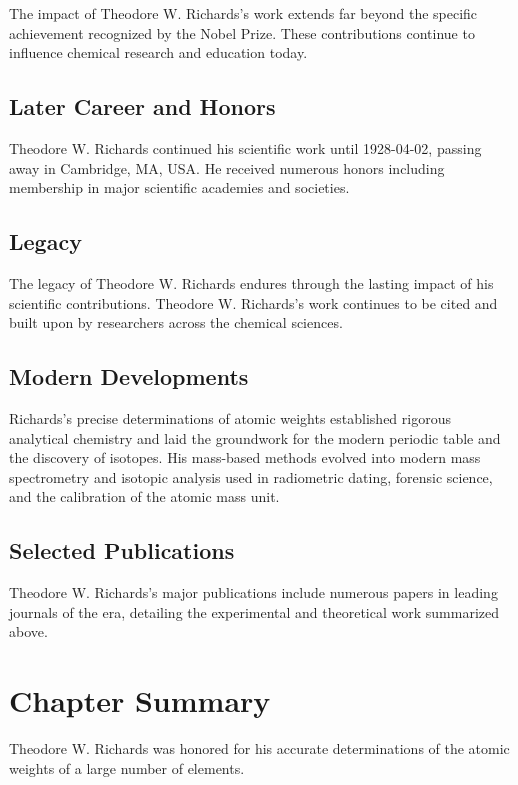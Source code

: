 The impact of Theodore W. Richards's work extends far beyond the specific achievement recognized by the Nobel Prize.
These contributions continue to influence chemical research and education today.

\subsection*{Later Career and Honors}

Theodore W. Richards continued his scientific work until 1928-04-02, passing away in Cambridge, MA, USA.
He received numerous honors including membership in major scientific academies and societies.

\subsection*{Legacy}

The legacy of Theodore W. Richards endures through the lasting impact of his scientific contributions.
Theodore W. Richards's work continues to be cited and built upon by researchers across the chemical sciences.

\subsection*{Modern Developments}

Richards's precise determinations of atomic weights established rigorous analytical chemistry and laid the groundwork for the modern periodic table and the discovery of isotopes. His mass-based methods evolved into modern mass spectrometry and isotopic analysis used in radiometric dating, forensic science, and the calibration of the atomic mass unit.

\subsection*{Selected Publications}

Theodore W. Richards's major publications include numerous papers in leading journals of the era, detailing the experimental and theoretical work summarized above.

\clearpage

\section*{Chapter Summary}

Theodore W. Richards was honored for his accurate determinations of the atomic weights of a large number of elements.
